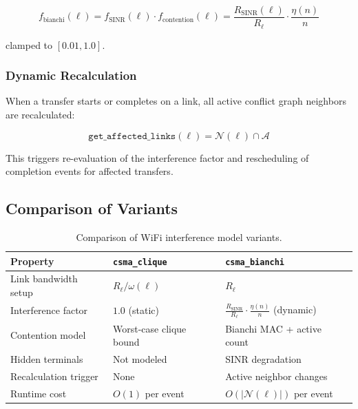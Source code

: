 \documentclass[11pt,letterpaper]{article}
\begin{document}
\begin{equation}
\label{eq:combined_factor}
\boxed{f_\text{bianchi}(\ell) = f_\text{SINR}(\ell) \cdot f_\text{contention}(\ell)
= \frac{R_\text{SINR}(\ell)}{R_\ell} \cdot \frac{\eta(n)}{n}}
\end{equation}

clamped to $[0.01, 1.0]$.

\subsubsection{Dynamic Recalculation}

When a transfer starts or completes on a link, all active conflict graph
neighbors are recalculated:

\begin{equation}
\texttt{get\_affected\_links}(\ell) = \mathcal{N}(\ell) \cap \mathcal{A}
\end{equation}

This triggers re-evaluation of the interference factor and rescheduling of
completion events for affected transfers.

\subsection{Comparison of Variants}

\begin{table}[h]
\centering
\caption{Comparison of WiFi interference model variants.}
\label{tab:comparison}
\begin{tabular}{@{}lll@{}}
\toprule
\textbf{Property} & \textbf{\texttt{csma\_clique}} & \textbf{\texttt{csma\_bianchi}} \\
\midrule
Link bandwidth setup & $R_\ell / \omega(\ell)$ & $R_\ell$ \\
Interference factor  & $1.0$ (static) & $\frac{R_\text{SINR}}{R_\ell} \cdot \frac{\eta(n)}{n}$ (dynamic) \\
Contention model     & Worst-case clique bound & Bianchi MAC + active count \\
Hidden terminals     & Not modeled & SINR degradation \\
Recalculation trigger & None & Active neighbor changes \\
Runtime cost         & $O(1)$ per event & $O(|\mathcal{N}(\ell)|)$ per event \\
\bottomrule
\end{tabular}
\end{table}

\end{document}
